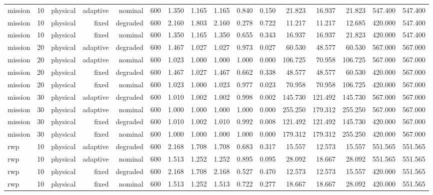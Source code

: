 \begin{tabular}{lrrrrrrrrrrrrrrr}
mission & 10 & physical & adaptive & nominal & 600 & 1.350 & 1.165 & 1.165 & 0.840 & 0.150 & 21.823 & 16.937 & 21.823 & 547.400 & 547.400 \\
mission & 10 & physical & fixed & degraded & 600 & 2.160 & 1.803 & 2.160 & 0.278 & 0.722 & 11.217 & 11.217 & 12.685 & 420.000 & 547.400 \\
mission & 10 & physical & fixed & nominal & 600 & 1.350 & 1.165 & 1.350 & 0.655 & 0.343 & 16.937 & 16.937 & 21.823 & 420.000 & 547.400 \\
mission & 20 & physical & adaptive & degraded & 600 & 1.467 & 1.027 & 1.027 & 0.973 & 0.027 & 60.530 & 48.577 & 60.530 & 567.000 & 567.000 \\
mission & 20 & physical & adaptive & nominal & 600 & 1.023 & 1.000 & 1.000 & 1.000 & 0.000 & 106.725 & 70.958 & 106.725 & 567.000 & 567.000 \\
mission & 20 & physical & fixed & degraded & 600 & 1.467 & 1.027 & 1.467 & 0.662 & 0.338 & 48.577 & 48.577 & 60.530 & 420.000 & 567.000 \\
mission & 20 & physical & fixed & nominal & 600 & 1.023 & 1.000 & 1.023 & 0.977 & 0.023 & 70.958 & 70.958 & 106.725 & 420.000 & 567.000 \\
mission & 30 & physical & adaptive & degraded & 600 & 1.010 & 1.002 & 1.002 & 0.998 & 0.002 & 145.730 & 121.492 & 145.730 & 567.000 & 567.000 \\
mission & 30 & physical & adaptive & nominal & 600 & 1.000 & 1.000 & 1.000 & 1.000 & 0.000 & 255.250 & 179.312 & 255.250 & 567.000 & 567.000 \\
mission & 30 & physical & fixed & degraded & 600 & 1.010 & 1.002 & 1.010 & 0.992 & 0.008 & 121.492 & 121.492 & 145.730 & 420.000 & 567.000 \\
mission & 30 & physical & fixed & nominal & 600 & 1.000 & 1.000 & 1.000 & 1.000 & 0.000 & 179.312 & 179.312 & 255.250 & 420.000 & 567.000 \\
rwp & 10 & physical & adaptive & degraded & 600 & 2.168 & 1.708 & 1.708 & 0.683 & 0.317 & 15.557 & 12.573 & 15.557 & 551.565 & 551.565 \\
rwp & 10 & physical & adaptive & nominal & 600 & 1.513 & 1.252 & 1.252 & 0.895 & 0.095 & 28.092 & 18.667 & 28.092 & 551.565 & 551.565 \\
rwp & 10 & physical & fixed & degraded & 600 & 2.168 & 1.708 & 2.168 & 0.527 & 0.470 & 12.573 & 12.573 & 15.557 & 420.000 & 551.565 \\
rwp & 10 & physical & fixed & nominal & 600 & 1.513 & 1.252 & 1.513 & 0.722 & 0.277 & 18.667 & 18.667 & 28.092 & 420.000 & 551.565 \\

\end{tabular}
